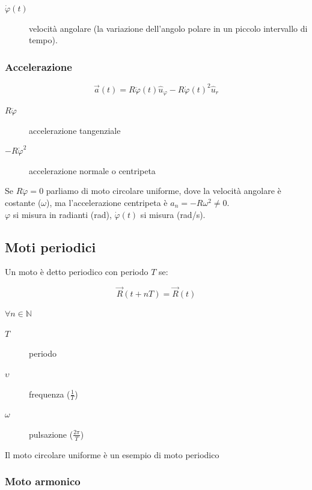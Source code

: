 \documentclass{subfiles}
\begin{document}
\begin{description}
    \item[$\dot{\varphi}(t)$] velocità angolare (la variazione dell'angolo polare in un piccolo intervallo di tempo).
\end{description}

\subsubsection{Accelerazione}

$$
\vec{a}(t) = R \ddot{\varphi}(t)\hat{u}_\varphi - R \dot{\varphi}(t)^2\hat{u}_r
$$

\begin{description}
    \item[$R\ddot{\varphi}$] accelerazione tangenziale
    \item[$-R\dot{\varphi}^2$] accelerazione normale o centripeta
\end{description}

\noindent
Se $R\ddot{\varphi} = 0$ parliamo di moto circolare uniforme,
dove la velocità angolare è costante ($\omega$),
ma l'accelerazione centripeta è $a_n = -R \omega^2 \neq 0$.\\

\noindent
$\varphi$ si misura in radianti (rad), $\dot{\varphi}(t)$ si misura (rad/s).

\subsection{Moti periodici}

Un moto è detto periodico con periodo $T$ se:

$$
\vec{R}(t+nT) = \vec{R}(t)
$$

\noindent
$\forall n \in \mathbb{N}$

\begin{description}
    \item[$T$] periodo
    \item[$\upsilon$] frequenza ($\frac{1}{T}$)
    \item[$\omega$] pulsazione ($\frac{2\pi}{T}$)
\end{description}

\noindent
Il moto circolare uniforme è un esempio di moto periodico

\subsubsection{Moto armonico}
\end{document}
